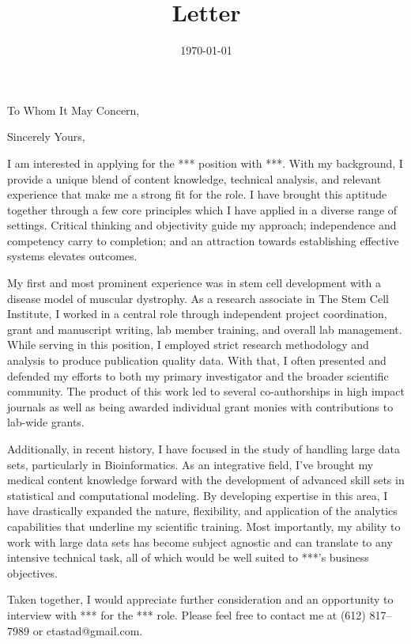 \documentclass[10pt,letter,sans]{moderncv/moderncv}
\makeatletter
\newcommand{\myphone}{(612) 817--7989}
\newcommand{\myemail}{ctastad@gmail.com}
\newcommand{\company}{***}
\newcommand{\role}{***}
\makeatother
\begin{document}

\title{Letter}
\recipient{HR Department}{\company{} \\ STREET ADDRESS \\ CITY, STATE ZIP}
\date{\today}
\opening{To Whom It May Concern,}
\closing{Sincerely Yours,}
\makelettertitle{}

I am interested in applying for the \role{} position with \company{}. With my background, I provide a unique blend of content knowledge, technical analysis, and relevant experience that make me a strong fit for the role. I have brought this aptitude together through a few core principles which I have applied in a diverse range of settings. Critical thinking and objectivity guide my approach; independence and competency carry to completion; and an attraction towards establishing effective systems elevates outcomes.

My first and most prominent experience was in stem cell development with a disease model of muscular dystrophy. As a research associate in The Stem Cell Institute, I worked in a central role through independent project coordination, grant and manuscript writing, lab member training, and overall lab management. While serving in this position, I employed strict research methodology and analysis to produce publication quality data. With that, I often presented and defended my efforts to both my primary investigator and the broader scientific community. The product of this work led to several co-authorships in high impact journals as well as being awarded individual grant monies with contributions to lab-wide grants.

Additionally, in recent history, I have focused in the study of handling large data sets, particularly in Bioinformatics. As an integrative field, I've brought my medical content knowledge forward with the development of advanced skill sets in statistical and computational modeling. By developing expertise in this area, I have drastically expanded the nature, flexibility, and application of the analytics capabilities that underline my scientific training. Most importantly, my ability to work with large data sets has become subject agnostic and can translate to any intensive technical task, all of which would be well suited to \company{}'s business objectives.

Taken together, I would appreciate further consideration and an opportunity to interview with \company{} for the \role{} role. Please feel free to contact me at \myphone{} or \myemail{}.
\end{document}
